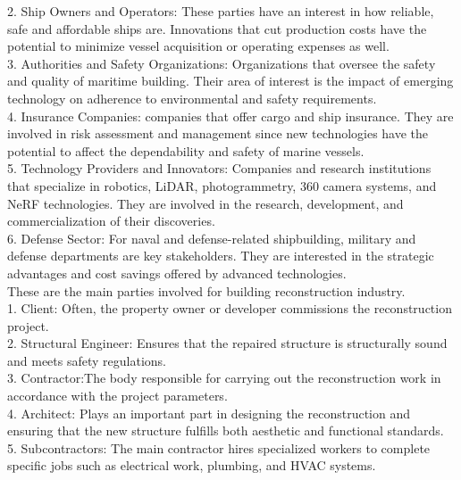 2. Ship Owners and Operators: These parties have an interest in how reliable, safe and affordable ships are. Innovations that cut production costs have the potential to minimize vessel acquisition or operating expenses as well.\\

3. Authorities and Safety Organizations:  Organizations that oversee the safety and quality of maritime building. Their area of interest is the impact of emerging technology on adherence to environmental and safety requirements. \\

4. Insurance Companies: companies that offer cargo and ship insurance. They are involved in risk assessment and management since new technologies have the potential to affect the dependability and safety of marine vessels. \\

5. Technology Providers and Innovators: Companies and research institutions that specialize in robotics, LiDAR, photogrammetry, 360 camera systems, and NeRF technologies. They are involved in the research, development, and commercialization of their discoveries.\\

6. Defense Sector: For naval and defense-related shipbuilding, military and defense departments are key stakeholders. They are interested in the strategic advantages and cost savings offered by advanced technologies.\\

\noindent These are the main parties involved for building reconstruction industry.\\

1. Client: Often, the property owner or developer commissions the reconstruction project.\\

2. Structural Engineer: Ensures that the repaired structure is structurally sound and meets safety regulations.\\

3. Contractor:The body responsible for carrying out the reconstruction work in accordance with the project parameters.\\

4. Architect: Plays an important part in designing the reconstruction and ensuring that the new structure fulfills both aesthetic and functional standards.\\

5. Subcontractors: The main contractor hires specialized workers to complete specific jobs such as electrical work, plumbing, and HVAC systems. 

